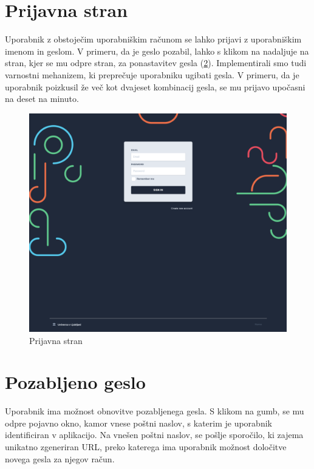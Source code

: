 \documentclass[a4paper, 12pt]{book}
\begin{document}
\section{Prijavna stran}
\label{sign-in-page}
Uporabnik z obstoječim uporabniškim računom se lahko prijavi z uporabniškim imenom in geslom. V primeru, da je geslo pozabil, lahko s klikom na  nadaljuje na stran, kjer se mu odpre stran, za ponastavitev gesla (\ref{forgotten-form}). Implementirali smo tudi varnostni mehanizem, ki preprečuje uporabniku ugibati gesla. V primeru, da je uporabnik poizkusil že več kot dvajeset kombinacij gesla, se mu prijavo upočasni na deset na minuto. 
\begin{figure}
\begin{center}
\includegraphics[width=1\textwidth]{slike/login-page.png}
\end{center}
\caption{ Prijavna stran }
\label{login-form}
\end{figure}

\section{Pozabljeno geslo}
\label{forgotten-form}
Uporabnik ima možnost obnovitve pozabljenega gesla. S klikom na gumb, se mu odpre pojavno okno, kamor vnese poštni naslov, s katerim je uporabnik identificiran v aplikacijo. Na vnešen poštni naslov, se pošlje sporočilo, ki zajema unikatno zgeneriran URL, preko katerega ima uporabnik možnost določitve novega gesla za njegov račun. 
\end{document}

